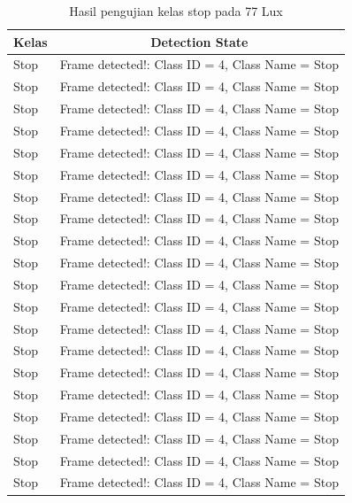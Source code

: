 \begin{longtable}{|l|c|}
  \caption{Hasil pengujian kelas stop pada 77 Lux}
  \label{tb:lux77stop} \\
  \hline
  \rowcolor[HTML]{C0C0C0} 
  \textbf{Kelas} & \textbf{Detection State}                           \\ \hline
  Stop           & Frame detected!: Class ID = 4, Class Name = Stop \\ \hline
  Stop           & Frame detected!: Class ID = 4, Class Name = Stop \\ \hline
  Stop           & Frame detected!: Class ID = 4, Class Name = Stop \\ \hline
  Stop           & Frame detected!: Class ID = 4, Class Name = Stop \\ \hline
  Stop           & Frame detected!: Class ID = 4, Class Name = Stop \\ \hline
  Stop           & Frame detected!: Class ID = 4, Class Name = Stop \\ \hline
  Stop           & Frame detected!: Class ID = 4, Class Name = Stop \\ \hline
  Stop           & Frame detected!: Class ID = 4, Class Name = Stop \\ \hline
  Stop           & Frame detected!: Class ID = 4, Class Name = Stop \\ \hline
  Stop           & Frame detected!: Class ID = 4, Class Name = Stop \\ \hline
  Stop           & Frame detected!: Class ID = 4, Class Name = Stop \\ \hline
  Stop           & Frame detected!: Class ID = 4, Class Name = Stop \\ \hline
  Stop           & Frame detected!: Class ID = 4, Class Name = Stop \\ \hline
  Stop           & Frame detected!: Class ID = 4, Class Name = Stop \\ \hline
  Stop           & Frame detected!: Class ID = 4, Class Name = Stop \\ \hline
  Stop           & Frame detected!: Class ID = 4, Class Name = Stop \\ \hline
  Stop           & Frame detected!: Class ID = 4, Class Name = Stop \\ \hline
  Stop           & Frame detected!: Class ID = 4, Class Name = Stop \\ \hline
  Stop           & Frame detected!: Class ID = 4, Class Name = Stop \\ \hline
  Stop           & Frame detected!: Class ID = 4, Class Name = Stop \\ \hline

\end{longtable}
